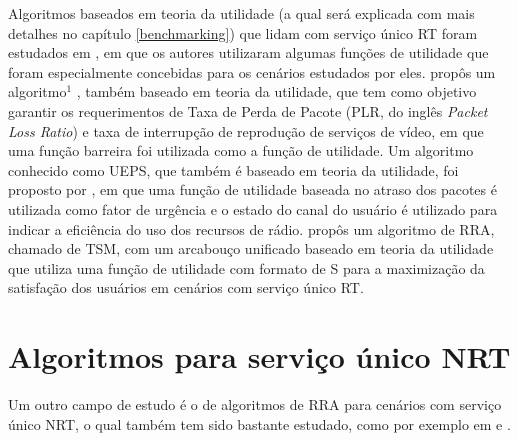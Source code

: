 Algoritmos baseados em teoria da utilidade (a qual será explicada com mais detalhes no capítulo \ref{benchmarking}) que lidam com serviço único RT foram estudados em  , em que os autores utilizaram algumas funções de utilidade que foram especialmente concebidas para os cenários estudados por eles.  propôs um algoritmo$^{1}$ , também baseado em teoria da utilidade, que tem como objetivo garantir os requerimentos de Taxa de Perda de Pacote (PLR, do inglês \textit{Packet Loss Ratio}) e taxa de interrupção de reprodução de serviços de vídeo, em que uma função barreira foi utilizada como a função de utilidade. Um algoritmo conhecido como \ac{UEPS}, que também é baseado em teoria da utilidade, foi proposto por , em que uma função de utilidade baseada no atraso dos pacotes é utilizada como fator de urgência e o estado do canal do usuário é utilizado para indicar a eficiência do uso dos recursos de rádio.  propôs um algoritmo de RRA, chamado de \ac{TSM}, com um arcabouço unificado baseado em teoria da utilidade que utiliza uma função de utilidade com formato de S para a maximização da satisfação dos usuários em cenários com serviço único RT.

\section{Algoritmos para serviço único NRT}

Um outro campo de estudo é o de algoritmos de RRA para cenários com serviço único NRT, o qual também tem sido bastante estudado, como por exemplo em  e .

